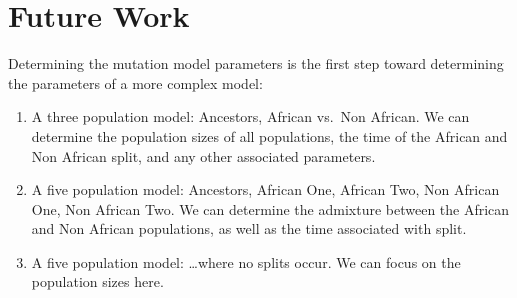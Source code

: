 \section{Future Work}\label{sec:fw}
Determining the mutation model parameters is the first step toward determining the parameters of a more complex model:
\begin{enumerate}
    \item A three population model: Ancestors, African vs.\ Non African.
        We can determine the population sizes of all populations, the time of the African and Non African split, and
        any other associated parameters.
    \item A five population model: Ancestors, African One, African Two, Non African One, Non African Two.
        We can determine the admixture between the African and Non African populations, as well as the time associated
        with split.
    \item A five population model: \ldots where no splits occur.
        We can focus on the population sizes here.
\end{enumerate}